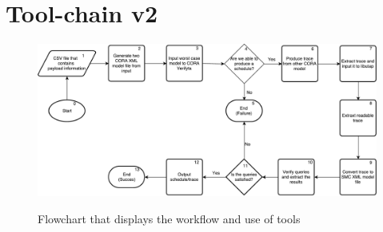 \section{Tool-chain v2}

\begin{figure}
	\includegraphics[width=\textwidth]{graphics/tool2.pdf}
	\label{fig:tool2}
	\caption{Flowchart that displays the workflow and use of tools}
\end{figure}
